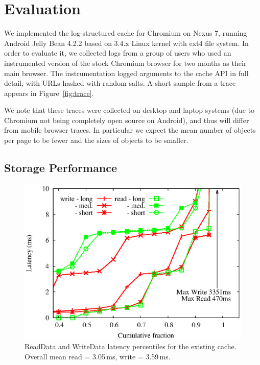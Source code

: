 \documentclass[letterpaper,twocolumn,10pt]{article}
\begin{document}
\section{Evaluation}

We implemented the log-structured cache for Chromium on Nexus 7, running Android
Jelly Bean 4.2.2 based on 3.4.x Linux kernel with ext4 file system.  In order to
evaluate it, we collected logs from a group of users who used an instrumented
version of the stock Chromium browser for two months as their main browser.  The
instrumentation logged arguments to the cache API in full detail, with URLs
hashed with random salts.  A short sample from a trace appears in
Figure~\ref{fig:trace}.

We note that these traces were collected on desktop and laptop systems (due to
Chromium not being completely open source on Android), and thus will differ from
mobile browser traces. In particular we expect the mean number of objects per
page to be fewer and the sizes of objects to be smaller.

\subsection{Storage Performance}

\begin{figure}
  \begin{center}
    \includegraphics[width=1.04\columnwidth]{graphs/disk-perf}
  \end{center}
  \caption{ReadData and WriteData latency percentiles for the existing
    cache. Overall mean read = 3.05\,ms, write = 3.59\,ms.}
  \label{fig:disk-perf} 
\vspace{-0.2in}
\end{figure}
\end{document}

